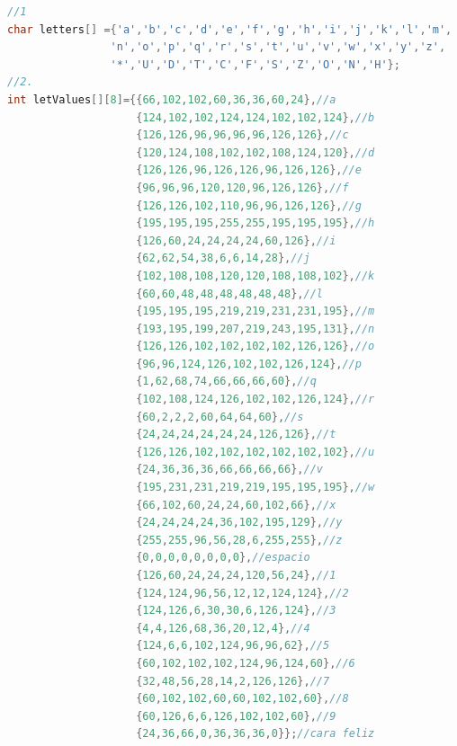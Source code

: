 \documentclass{article}
\begin{document}
\newpage
\begin{lstlisting}[language=C++, label=codigo_ejemplo]
//1
char letters[] ={'a','b','c','d','e','f','g','h','i','j','k','l','m',
                'n','o','p','q','r','s','t','u','v','w','x','y','z',
                '*','U','D','T','C','F','S','Z','O','N','H'};
//2.
int letValues[][8]={{66,102,102,60,36,36,60,24},//a
                    {124,102,102,124,124,102,102,124},//b
                    {126,126,96,96,96,96,126,126},//c
                    {120,124,108,102,102,108,124,120},//d
                    {126,126,96,126,126,96,126,126},//e
                    {96,96,96,120,120,96,126,126},//f
                    {126,126,102,110,96,96,126,126},//g
                    {195,195,195,255,255,195,195,195},//h
                    {126,60,24,24,24,24,60,126},//i
                    {62,62,54,38,6,6,14,28},//j
                    {102,108,108,120,120,108,108,102},//k
                    {60,60,48,48,48,48,48,48},//l
                    {195,195,195,219,219,231,231,195},//m
                    {193,195,199,207,219,243,195,131},//n
                    {126,126,102,102,102,102,126,126},//o
                    {96,96,124,126,102,102,126,124},//p
                    {1,62,68,74,66,66,66,60},//q
                    {102,108,124,126,102,102,126,124},//r
                    {60,2,2,2,60,64,64,60},//s
                    {24,24,24,24,24,24,126,126},//t
                    {126,126,102,102,102,102,102,102},//u
                    {24,36,36,36,66,66,66,66},//v
                    {195,231,231,219,219,195,195,195},//w
                    {66,102,60,24,24,60,102,66},//x
                    {24,24,24,24,36,102,195,129},//y
                    {255,255,96,56,28,6,255,255},//z
                    {0,0,0,0,0,0,0,0},//espacio
                    {126,60,24,24,24,120,56,24},//1
                    {124,124,96,56,12,12,124,124},//2
                    {124,126,6,30,30,6,126,124},//3
                    {4,4,126,68,36,20,12,4},//4
                    {124,6,6,102,124,96,96,62},//5
                    {60,102,102,102,124,96,124,60},//6
                    {32,48,56,28,14,2,126,126},//7
                    {60,102,102,60,60,102,102,60},//8
                    {60,126,6,6,126,102,102,60},//9
                    {24,36,66,0,36,36,36,0}};//cara feliz
\end{lstlisting}
\end{document}
